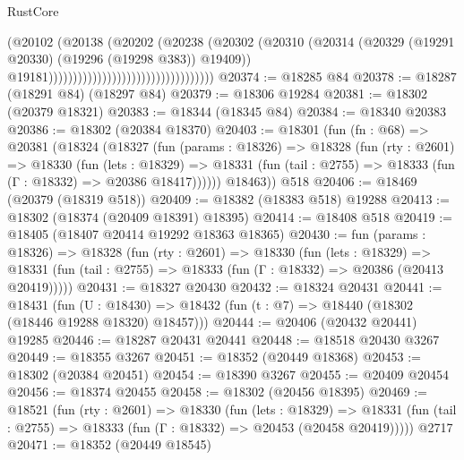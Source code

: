 \begin{lexlean}{RustCore}
\begin{coremodule}
                                                            (@20102
                                                              (@20138
                                                                (@20202
                                                                  (@20238
                                                                    (@20302
                                                                      (@20310
                                                                        (@20314
                                                                          (@20329
                                                                            (@19291 @20330)
                                                                            (@19296 (@19298 @383))
                                                                            @19409))
                                                                        @19181))))))))))))))))))))))))))))))))))
@20374 := @18285 @84
@20378 := @18287 (@18291 @84) (@18297 @84)
@20379 := @18306 @19284
@20381 := @18302 (@20379 @18321)
@20383 := @18344 (@18345 @84)
@20384 := @18340 @20383
@20386 := @18302 (@20384 @18370)
@20403 := @18301
    (fun (fn : @68) =>
    @20381
      (@18324
        (@18327
          (fun (params : @18326) =>
          @18328
            (fun (rty : @2601) =>
            @18330
              (fun (lets : @18329) =>
              @18331 (fun (tail : @2755) => @18333 (fun (Γ : @18332) => @20386 @18417))))))
        @18463))
    @518
@20406 := @18469 (@20379 (@18319 @518))
@20409 := @18382 (@18383 @518) @19288
@20413 := @18302 (@18374 (@20409 @18391) @18395)
@20414 := @18408 @518
@20419 := @18405 (@18407 @20414 @19292 @18363 @18365)
@20430 := fun (params : @18326) =>
  @18328
    (fun (rty : @2601) =>
    @18330
      (fun (lets : @18329) =>
      @18331 (fun (tail : @2755) => @18333 (fun (Γ : @18332) => @20386 (@20413 @20419)))))
@20431 := @18327 @20430
@20432 := @18324 @20431
@20441 := @18431
    (fun (U : @18430) => @18432 (fun (t : @7) => @18440 (@18302 (@18446 @19288 @18320) @18457)))
@20444 := @20406 (@20432 @20441) @19285
@20446 := @18287 @20431 @20441
@20448 := @18518 @20430 @3267
@20449 := @18355 @3267
@20451 := @18352 (@20449 @18368)
@20453 := @18302 (@20384 @20451)
@20454 := @18390 @3267
@20455 := @20409 @20454
@20456 := @18374 @20455
@20458 := @18302 (@20456 @18395)
@20469 := @18521
    (fun (rty : @2601) =>
    @18330
      (fun (lets : @18329) =>
      @18331 (fun (tail : @2755) => @18333 (fun (Γ : @18332) => @20453 (@20458 @20419)))))
    @2717
@20471 := @18352 (@20449 @18545)

\end{coremodule}
\end{lexlean}

